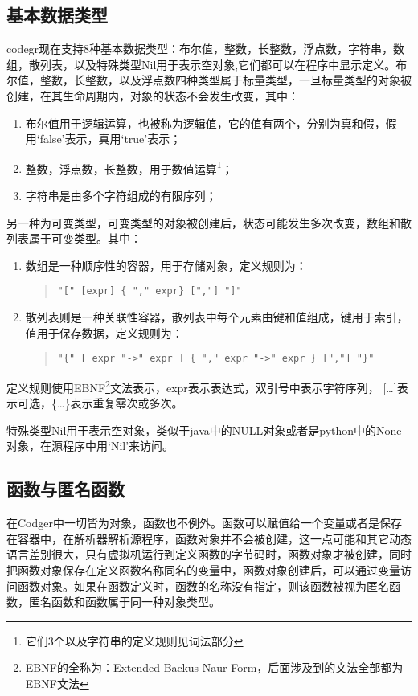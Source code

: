 \subsection{基本数据类型}
codegr现在支持8种基本数据类型：布尔值，整数，长整数，浮点数，字符串，数组，散列表，以及特殊类型Nil用于表示空对象,它们都可以在程序中显示定义。布尔值，整数，长整数，以及浮点数四种类型属于标量类型，一旦标量类型的对象被创建，在其生命周期内，对象的状态不会发生改变，其中：
\begin{enumerate}
\item 布尔值用于逻辑运算，也被称为逻辑值，它的值有两个，分别为真和假，假用`false'表示，真用`true'表示；
\item 整数，浮点数，长整数，用于数值运算\footnote{它们3个以及字符串的定义规则见词法部分}；
\item 字符串是由多个字符组成的有限序列；
\end{enumerate}

另一种为可变类型，可变类型的对象被创建后，状态可能发生多次改变，数组和散列表属于可变类型。其中：
\begin{enumerate}
\item 数组是一种顺序性的容器，用于存储对象，定义规则为：
\begin{quote}
\begin{verbatim}
"[" [expr] { "," expr} [","] "]"
\end{verbatim}
\end{quote}
\item 散列表则是一种关联性容器，散列表中每个元素由键和值组成，键用于索引，值用于保存数据，定义规则为：
\begin{quote}
\begin{verbatim}
"{" [ expr "->" expr ] { "," expr "->" expr } [","] "}"
\end{verbatim}
\end{quote}
\end{enumerate}
定义规则使用EBNF\footnote{EBNF的全称为：Extended Backus-Naur Form，后面涉及到的文法全部都为EBNF文法}文法表示，expr表示表达式，双引号中表示字符序列， [\ldots{}]表示可选，\{\ldots{}\}表示重复零次或多次。

特殊类型Nil用于表示空对象，类似于java中的NULL对象或者是python中的None对象，在源程序中用`Nil'来访问。

\subsection{函数与匿名函数}
在Codger中一切皆为对象，函数也不例外。函数可以赋值给一个变量或者是保存在容器中，在解析器解析源程序，函数对象并不会被创建，这一点可能和其它动态语言差别很大，只有虚拟机运行到定义函数的字节码时，函数对象才被创建，同时把函数对象保存在定义函数名称同名的变量中，函数对象创建后，可以通过变量访问函数对象。如果在函数定义时，函数的名称没有指定，则该函数被视为匿名函数，匿名函数和函数属于同一种对象类型。
